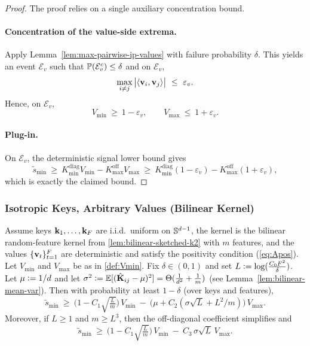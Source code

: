 \begin{proof}
The proof relies on a single auxiliary concentration bound.

\paragraph{Concentration of the value-side extrema.}
Apply Lemma~\ref{lem:max-pairwise-ip-values} with failure probability $\delta$.
This yields an event $\mathcal{E}_{v}$ such that
$\mathbb{P}(\mathcal{E}_{v}^c)\le \delta$ and on $\mathcal{E}_{v}$,
\[
\max_{i\neq j}\big|\ip{\vv_i}{\vv_j}\big|\ \le\ \varepsilon_{v}.
\]
Hence, on $\mathcal{E}_{v}$,
\[
V_{\min}\ \ge\ 1-\varepsilon_{v},
\qquad
V_{\max}\ \le\ 1+\varepsilon_{v}.
\]

\paragraph{Plug-in.}
On $\mathcal{E}_{v}$, the deterministic signal lower bound gives
\[
\widetilde{s}_{\min}\ \ge\ K_{\min}^{\mathrm{diag}}V_{\min}-K_{\max}^{\mathrm{off}}V_{\max}
\ \ge\ K_{\min}^{\mathrm{diag}}(1-\varepsilon_{v})-K_{\max}^{\mathrm{off}}(1+\varepsilon_{v}),
\]
which is exactly the claimed bound.
\end{proof}


\subsubsection{Isotropic Keys, Arbitrary Values (Bilinear Kernel)}
\begin{theorem}
\label{app:signal-isokeys-arbvalues}
Assume keys ${\mathbf{k}}_{1},\dots,{\mathbf{k}}_{F}$ are i.i.d.\ uniform on $\mathbb{S}^{d-1}$, the kernel is the bilinear random-feature kernel from \cref{lem:bilinear-sketched-k2} with $m$ features, and the values $\{{\mathbf{v}}_{t}\}_{t=1}^F$ are deterministic and satisfy the positivity condition (\eqref{eq:Apos}).
Let $V_{\min}$ and $V_{\max}$ be as in \cref{def:Vmin}.
Fix $\delta\in(0,1)$ and set $L\vcentcolon= \log(\tfrac{C_{0} F^2}{\delta})$.
Let $\mu\vcentcolon= 1/d$ and let $\sigma^2\vcentcolon= \mathbb{E}[(\hat{\mathbf{K}}_{ij}-\mu)^2]=\Theta(\tfrac{1}{d^2}+\tfrac{1}{m})$
(see Lemma~\ref{lem:bilinear-mean-var}).
Then with probability at least $1-\delta$ (over keys and features),
\[
\widetilde{s}_{\min}
\ \ge\
\Big(1-C_{1}\sqrt{\tfrac{L}{m}}\Big)\,V_{\min}
\ -\
\Big(\mu+C_{2}(\sigma\sqrt{L}+L^2/m)\Big)\,V_{\max}.
\]
Moreover, if $L\ge 1$ and $m \geq L^3$,
then the off-diagonal coefficient simplifies and
\[
\widetilde{s}_{\min}
\ \ge\
\Big(1-C_{1}\sqrt{\tfrac{L}{m}}\Big)\,V_{\min}
\ -\
C_{3}\,\sigma\sqrt{L}\,V_{\max}.
\]
\end{theorem}

